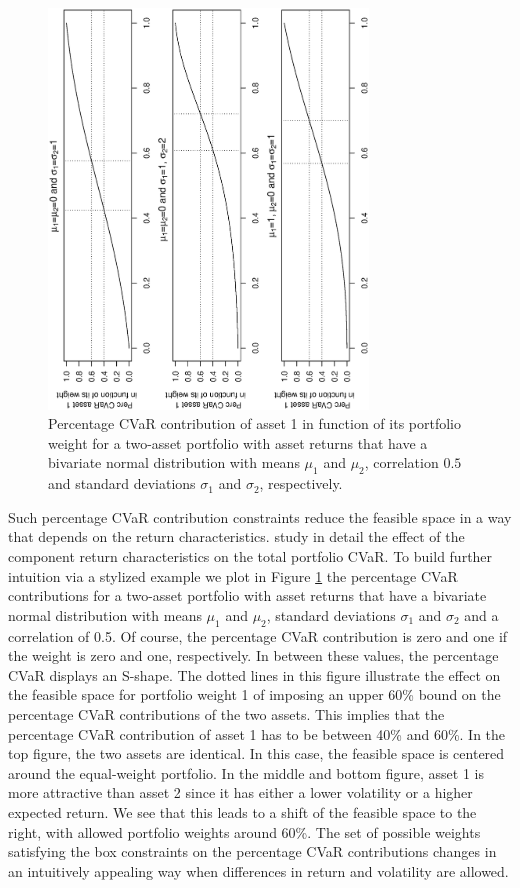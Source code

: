 \documentclass[12pt,a4paper]{article}
\begin{document}
\begin{figure}[tb] \label{fig:sensitivityfixedrho}
\begin{center}
\caption{Percentage CVaR contribution of asset 1 in function of its portfolio weight for a two-asset portfolio with asset returns that have a bivariate normal distribution with means $\mu_1$ and $\mu_2$, correlation $0.5$ and standard deviations $\sigma_1$ and $\sigma_2$, respectively.   }
\includegraphics[width=8.5cm,angle=270]{sensitivity_rho50.eps}
\end{center}
\end{figure}

Such percentage CVaR contribution constraints reduce the feasible space in a way that depends on the return characteristics. \citet{Stoyanov2009} study in detail the effect of the component return characteristics on the total portfolio CVaR. To build further intuition via a stylized example we plot in Figure \ref{fig:sensitivityfixedrho} the percentage CVaR contributions for a two-asset portfolio with asset returns that have a bivariate normal distribution with means $\mu_1$  and $\mu_2$, standard deviations $\sigma_1$ and $\sigma_2$  and a correlation of 0.5. Of course, the percentage CVaR contribution is zero and one if the weight is zero and one, respectively. In between these values, the percentage CVaR displays an S-shape. The dotted lines in this figure illustrate the effect on the feasible space for portfolio weight 1 of imposing an upper 60\% bound on the percentage CVaR contributions of the two assets. This implies that the percentage CVaR contribution of asset 1 has to be between 40\% and 60\%. In the top figure, the two assets are identical. In this case, the feasible space is centered around the equal-weight portfolio. In the middle and bottom figure, asset 1 is more attractive than asset 2 since it has either a lower volatility or a higher expected return. We see that this leads to a shift of the feasible space to the right, with allowed portfolio weights around 60\%. The set of possible weights satisfying the box constraints on the percentage CVaR contributions changes in an intuitively appealing way when differences in return and volatility are allowed.
\end{document}
